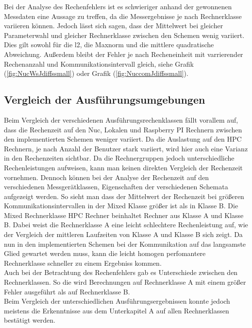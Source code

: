 Bei der Analyse des Rechenfehlers ist es schwieriger anhand der gewonnenen Messdaten eine Aussage zu treffen, da die Messergebnisse je nach Rechnerklasse variieren k\"onnen.  Jedoch l\"asst sich sagen, dass der Mittelwert bei gleicher Parameterwahl und gleicher Rechnerklasse zwischen den Schemen wenig variiert. Dies gilt sowohl f\"ur die l2, die Maxnorm und die mittlere quadratische Abweichung. Au\ss{}erdem bleibt der Fehler je nach Recheneinheit mit varrierender Rechenanzahl und Kommunikationsintervall gleich, siehe Grafik (\ref{fig:NucWsJdiffssmall}) oder Grafik (\ref{fig:NuccomJdiffssmall}).\\

\subsection{Vergleich der Ausführungsumgebungen}
Beim Vergleich der verschiedenen Ausf\"uhrungsrechenklassen f\"allt vorallem auf, dass die Rechenzeit auf den Nuc, Lokalen und Raspberry PI Rechnern zwischen den implementierten Schemen weniger variiert. Da die Auslastung auf den HPC Rechnern, je nach Anzahl der Benutzer stark variiert, wird hier auch eine Varianz in den Rechenzeiten sichtbar. Da die Rechnergruppen jedoch unterschiedliche Rechenleistungen aufweisen, kann man keinen direkten Vergleich der Rechenzeit vornehmen. Dennoch k\"onnen bei der Analyse der Rechenzeit auf den verschiedenen Messger\"atklassen, Eigenschaften der verschiedenen Schemata aufgezeigt werden. So sieht man dass der Mittelwert der Rechenzeit bei gr\"o\ss{}eren Kommunikationsintervallen in der Mixed Klasse gr\"o\ss{}er ist als in Klasse B. Die Mixed Rechnerklasse HPC Rechner beinhaltet Rechner aus Klasse A und Klasse B. Dabei weist die Rechnerklasse A eine leicht schlechtere Rechenleistung auf, wie der Vergleich der mittleren Laufzeiten von Klasse A und Klasse B sich zeigt. Da nun in den implementierten Schemen bei der Kommunikation auf das langsamste Glied gewartet werden muss, kann die leicht homogen perfomantere Rechnerklasse schneller zu einem Ergebniss kommen.\\
Auch bei der Betrachtung des Rechenfehlers gab es Unterschiede zwischen den Rechnerklassen. So die wird Berechnungen auf Rechnerklasse A mit einem gr\"o\ss{}er Fehler ausgef\"uhrt als auf Rechnerklasse B. \\
Beim Vergleich der unterschiedlichen Ausf\"uhrungsergebnissen konnte jedoch meistens die Erkenntnisse aus dem Unterkapitel A auf allen Rechnerklassen best\"atigt werden. 


